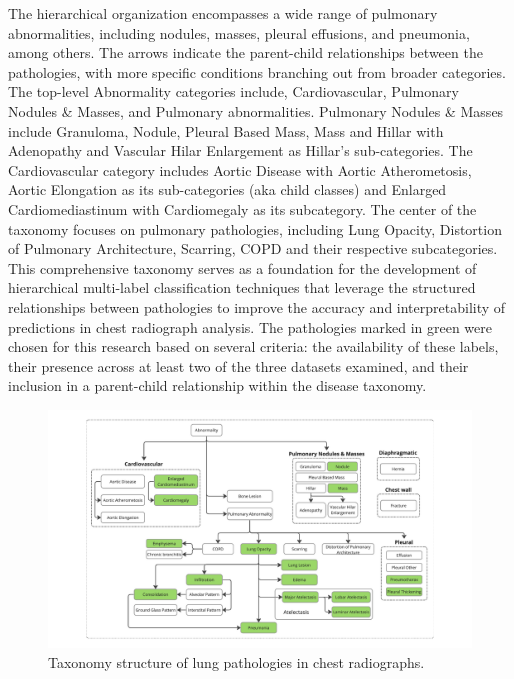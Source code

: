 \documentclass[review,1p,times,numbers]{elsarticle}
\begin{document}
The hierarchical organization encompasses a wide range of pulmonary abnormalities, including nodules, masses, pleural effusions, and pneumonia, among others. The arrows indicate the parent-child relationships between the pathologies, with more specific conditions branching out from broader categories. The top-level Abnormality categories include, Cardiovascular, Pulmonary Nodules \& Masses, and Pulmonary abnormalities. Pulmonary Nodules \& Masses include Granuloma, Nodule, Pleural Based Mass, Mass and Hillar with Adenopathy and Vascular Hilar Enlargement as Hillar's sub-categories. The Cardiovascular category includes Aortic Disease with Aortic Atherometosis, Aortic Elongation as its sub-categories (aka child classes) and Enlarged Cardiomediastinum with Cardiomegaly as its subcategory. The center of the taxonomy focuses on pulmonary pathologies, including Lung Opacity, Distortion of Pulmonary Architecture, Scarring, COPD and their respective subcategories. This comprehensive taxonomy serves as a foundation for the development of hierarchical multi-label classification techniques that leverage the structured relationships between pathologies to improve the accuracy and interpretability of predictions in chest radiograph analysis.
The pathologies marked in green were chosen for this research based on several criteria: the availability of these labels, their presence across at least two of the three datasets examined, and their inclusion in a parent-child relationship within the disease taxonomy.
\begin{figure}[htbp]
    \centering
    \includegraphics[width=\textwidth]{figures/taxonomy_structure/taxonomy_structure.pdf}
    \caption[Taxonomy Structure of Lung Pathologies in Chest Radiographs]{Taxonomy structure of lung pathologies in chest radiographs.}\label{fig:taxonomy.fig.1.taxonomy_structure}
\end{figure}
\end{document}
